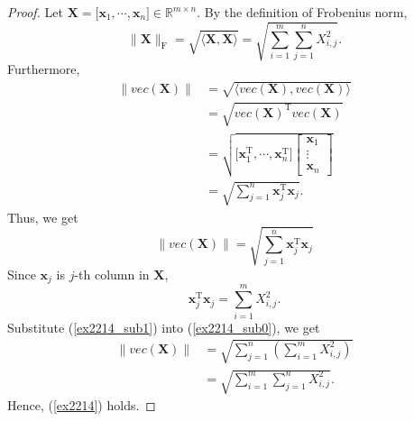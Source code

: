 \documentclass{article}
\theoremstyle{plain}
\begin{document}
\begin{proof}
	Let $\bm{X}= \lbrack \bm{x}_1 , \cdots , \bm{x}_n \rbrack  \in \mathbb{R}^{m \times n}$. By the definition of Frobenius norm,
	\begin{equation*}
		\lVert \bm{X} \rVert_{\mathrm{F}} = \sqrt{\langle \bm{X} , \bm{X} \rangle} = \sqrt{\sum_{i=1}^m \sum_{j=1}^n X_{i,j}^2}.
	\end{equation*}
	Furthermore,
	\begin{equation*}
		\begin{split}
			\lVert vec(\bm{X}) \rVert &= \sqrt{\langle vec(\bm{X}) , vec(\bm{X}) \rangle} \\
			&= \sqrt{vec(\bm{X})^{\mathrm{T}} vec(\bm{X})} \\
			&= \sqrt{\lbrack \bm{x}_1^{\mathrm{T}} , \cdots , \bm{x}_n^{\mathrm{T}} \rbrack
			\begin{bmatrix}
				\bm{x}_1 \\
				\vdots \\
				\bm{x}_n
			\end{bmatrix}
			} \\
			&= \sqrt{\sum_{j=1}^n \bm{x}_j^{\mathrm{T}} \bm{x}_j} .
		\end{split}
	\end{equation*}
	Thus, we get
	\begin{equation}
		\label{ex2214_sub0}
		\lVert vec(\bm{X}) \rVert = \sqrt{\sum_{j=1}^n \bm{x}_j^{\mathrm{T}} \bm{x}_j}
	\end{equation}
	Since $\bm{x}_j$ is $j$-th column in $\bm{X}$,
	\begin{equation}
		\label{ex2214_sub1}
		\bm{x}_j^{\mathrm{T}} \bm{x}_j = \sum_{i=1}^m X_{i,j}^2 .
	\end{equation}
	Substitute (\ref{ex2214_sub1}) into (\ref{ex2214_sub0}), we get
	\begin{equation*}
		\begin{split}
			\lVert vec(\bm{X}) \rVert &= \sqrt{\sum_{j=1}^n \left( \sum_{i=1}^m X_{i,j}^2 \right)} \\
			&= \sqrt{\sum_{i=1}^m \sum_{j=1}^n X_{i,j}^2} .
		\end{split}
	\end{equation*}
	Hence, (\ref{ex2214}) holds.
\end{proof}
\end{document}
